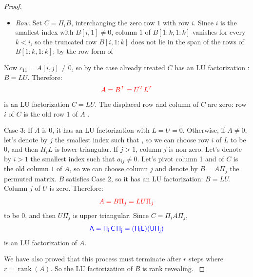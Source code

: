 \documentclass[10pt,twoside]{siamart1116}
\DeclareMathOperator{\rk}{rank}
\numberwithin{theorem}{section}
\providecommand{\DIFadd}[1]{{\protect\color{blue} \sf #1}} %
\providecommand{\DIFdel}[1]{{\protect\color{red} \scriptsize #1}} %
\providecommand{\DIFaddbegin}{} %
\providecommand{\DIFaddend}{} %
\providecommand{\DIFdelbegin}{} %
\providecommand{\DIFdelend}{} %
\begin{document}
\begin{proof}
\begin{itemize}
\DIFdel{Since $b_{11} \neq 0$, $B$ has an LU factorization: $B = LU$. Column $j$ }\DIFdelend \DIFaddbegin \DIFadd{If $j = 1$, set $B = A$. Either way column $1$ }\DIFaddend of $B$ is \DIFdelbegin \DIFdel{zero. If column $j$ of $U$ is non-zero, we can zeroit out without affecting any column in $LU$.
    So we can always choose $U$ such that column $j$ is zero . We have:
	}\[ \DIFdel{A = B \Pi_j = L U \Pi_j }\]%
\DIFdelend \DIFaddbegin \DIFadd{nonzero and row $1$ of $B$ is zero, so $b_{11} = 0$ }\DIFaddend and \DIFdelbegin \DIFdel{$U \Pi_j$ is still upper triangular because $\Pi_j$ only permutes column 1 and $j$.
  Therefore $A$ has an LU factorization.
}%

\DIFdel{Case 2: $A[1,:] = 0$. Consider $B = A^T$. $B$ corresponds to Case 1, so $B$ }\DIFdelend \DIFaddbegin \DIFadd{$i \ge 2$.
    }\item \DIFadd{\emph{Row.} Set $C = \Pi_i B$, interchanging the zero row $1$ with row $i$. Since $i$ is the smallest index with $B[i,1] \neq 0$, column $1$ of $B[1:k,1:k]$ vanishes for every $k < i$, so the truncated row $B[i,1:k]$ does not lie in the span of the rows of $B[1:k,1:k]$; by the row form of }\Cref{lem:zero-line-indep}\DIFadd{, $C$ satisfies }\Cref{prop:rank}\DIFadd{.
  }\end{itemize}
  \DIFadd{Now $c_{11} = A[i,j] \neq 0$, so by the case already treated $C$ }\DIFaddend has an LU factorization \DIFdelbegin \DIFdel{: $B = L U$. Therefore: }\[ \DIFdel{A = B^T = U^T L^T }\]%
\DIFdel{is an LU factorization }\DIFdelend \DIFaddbegin \DIFadd{$C = LU$. The displaced row and column of $C$ are zero: row $i$ }\DIFaddend of \DIFaddbegin \DIFadd{$C$ is the old row $1$ of }\DIFaddend $A$\DIFdelbegin \DIFdel{.
}%

\DIFdel{Case 3: If $A$ is 0, it has an LU factorization with $L=U=0$. Otherwise, if $A \neq 0$, let's denote by $j$ the smallest index such that }\DIFdelend \DIFaddbegin \DIFadd{, so we can choose row $i$ of $L$ to be $0$, and then $\Pi_i L$ is lower triangular. If $j > 1$, }\DIFaddend column $j$ \DIFdelbegin \DIFdel{is non zero. Let's denote by $i > 1$ the smallest index such that $a_{ij} \neq 0$. Let's pivot column 1 and }\DIFdelend \DIFaddbegin \DIFadd{of $C$ is the old column $1$ of $A$, so we can choose column }\DIFaddend $j$ \DIFdelbegin \DIFdel{and denote by $B = A \Pi_j$ the permuted matrix. $B$ satisfies Case 2, so it has an LU factorization: $B = L U$. Column $j$ }\DIFdelend of $U$ \DIFdelbegin \DIFdel{is zero. Therefore:
	}\[ \DIFdel{A = B \Pi_j = L U \Pi_j }\]%
\DIFdelend \DIFaddbegin \DIFadd{to be $0$, and then $U \Pi_j$ is upper triangular. Since $C = \Pi_i A \Pi_j$,
  }\[
    \DIFadd{A = \Pi_i\, C\, \Pi_j = (\Pi_i L)(U \Pi_j)
  }\]\DIFaddend 
  is an LU factorization of $A$.

\DIFdelbegin \DIFdel{We have also proved that this process must terminate after $r$ steps where $r = \rk(A)$. So the LU factorization of $B$ is rank revealing.
}\DIFdelend \end{proof}
\end{document}

